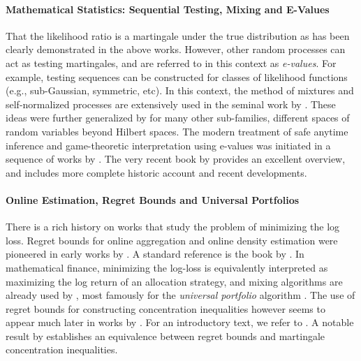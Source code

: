 \paragraph{Mathematical Statistics: Sequential Testing, Mixing and E-Values}
That the likelihood ratio is a martingale under the true distribution as has been clearly demonstrated in the above works. However, other random processes can act as testing martingales, and are referred to in this context as \emph{e-values}. For example, testing sequences can be constructed for classes of likelihood functions (e.g., sub-Gaussian, symmetric, etc). In this context, the method of mixtures and self-normalized processes are extensively used in the seminal work by \citet{pena2009self}. These ideas were further generalized by \cite{Howard2018,Howard2020,chowdhury2023bregman} for many other sub-families, different spaces of random variables beyond Hilbert spaces. The modern treatment of safe anytime inference and game-theoretic interpretation using e-values was initiated in a sequence of works by \citet{vovk2014game,grunwald2020safe,wang2022false,shafer2019game}. The very recent book by \citet{ramdas2024hypothesis} provides an excellent overview, and includes more complete historic account and recent developments. 


\paragraph{Online Estimation, Regret Bounds and Universal Portfolios} There is a rich history on works that study the problem of minimizing the log loss. Regret bounds for online aggregation and online density estimation were pioneered in early works by \citet{vovk1990aggregating,littlestone1994weighted}. A standard reference is the book by \citet{cesa2006prediction}.  In mathematical finance, minimizing the log-loss is equivalently interpreted as maximizing the log return of an allocation strategy, and mixing algorithms are already used by \citet{cover1984algorithm}, most famously for the \emph{universal portfolio}  algorithm \citep{cover1991universal}. The use of regret bounds for constructing concentration inequalities however seems to appear much later in works by \citet{rakhlin2017equivalence,orabona2023tight,ryu2024confidence}. For an introductory text, we refer to \citet{orabona2019modern}. A notable result by  \citet{rakhlin2017equivalence} establishes an equivalence between regret bounds and martingale concentration inequalities.

